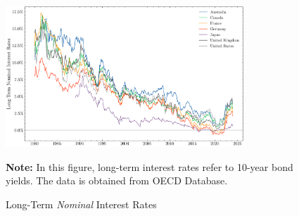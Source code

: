 \begin{figure}[H]
    \centering
    \caption{Long-Term \textit{Nominal} Interest Rates}
    \includegraphics[width=0.8\textwidth]{figures/long-term-rates.png}
    
    \vspace{15pt}
    
    \begin{minipage}{\textwidth}
        \footnotesize %
        \textbf{Note:} In this figure, long-term interest rates refer to 10-year bond yields. The data is obtained from OECD Database.
    \end{minipage}
    \label{fig:long-term-rates}
\end{figure}
